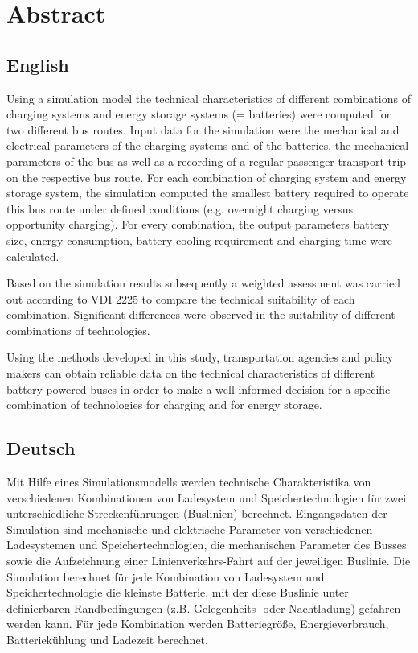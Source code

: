 \chapter*{Abstract}
\section*{English}
Using a simulation model the technical characteristics of different combinations of charging systems and energy storage systems (= batteries) were computed for two different bus routes. Input data for the simulation were the mechanical and electrical parameters of the charging systems and of the batteries, the mechanical parameters of the bus as well as a recording of a regular passenger transport trip on the respective bus route. For each combination of charging system and energy storage system, the simulation computed the smallest battery required to operate this bus route under defined conditions (e.g. overnight charging versus opportunity charging). For every combination, the output parameters battery size, energy consumption, battery cooling requirement and charging time were calculated.

Based on the simulation results subsequently a weighted assessment was carried out according to VDI 2225 to compare the technical suitability of each combination. Significant differences were observed in the suitability of different combinations of technologies.

Using the methods developed in this study, transportation agencies and policy makers can obtain reliable data on the technical characteristics of different battery-powered buses in order to make a well-informed decision for a specific combination of technologies for charging and for energy storage.


\section*{Deutsch}
Mit Hilfe eines Simulationsmodells werden technische Charakteristika von verschiedenen Kombinationen von Ladesystem und Speichertechnologien für zwei unterschiedliche Streckenführungen (Buslinien) berechnet. Eingangsdaten der Simulation sind mechanische und elektrische Parameter von verschiedenen Ladesystemen und Speichertechnologien, die mechanischen Parameter des Busses sowie die Aufzeichnung einer Linienverkehrs-Fahrt auf der jeweiligen Buslinie. Die Simulation berechnet für jede Kombination von Ladesystem und Speichertechnologie die kleinste Batterie, mit der diese Buslinie unter definierbaren Randbedingungen (z.B. Gelegenheits- oder Nachtladung) gefahren werden kann. Für jede Kombination werden Batteriegröße, Energieverbrauch, Batteriekühlung und Ladezeit berechnet.

